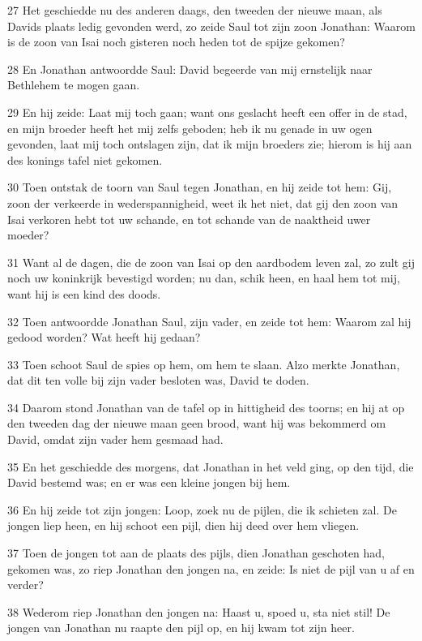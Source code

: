 \par 27 Het geschiedde nu des anderen daags, den tweeden der nieuwe maan, als Davids plaats ledig gevonden werd, zo zeide Saul tot zijn zoon Jonathan: Waarom is de zoon van Isai noch gisteren noch heden tot de spijze gekomen?
\par 28 En Jonathan antwoordde Saul: David begeerde van mij ernstelijk naar Bethlehem te mogen gaan.
\par 29 En hij zeide: Laat mij toch gaan; want ons geslacht heeft een offer in de stad, en mijn broeder heeft het mij zelfs geboden; heb ik nu genade in uw ogen gevonden, laat mij toch ontslagen zijn, dat ik mijn broeders zie; hierom is hij aan des konings tafel niet gekomen.
\par 30 Toen ontstak de toorn van Saul tegen Jonathan, en hij zeide tot hem: Gij, zoon der verkeerde in wederspannigheid, weet ik het niet, dat gij den zoon van Isai verkoren hebt tot uw schande, en tot schande van de naaktheid uwer moeder?
\par 31 Want al de dagen, die de zoon van Isai op den aardbodem leven zal, zo zult gij noch uw koninkrijk bevestigd worden; nu dan, schik heen, en haal hem tot mij, want hij is een kind des doods.
\par 32 Toen antwoordde Jonathan Saul, zijn vader, en zeide tot hem: Waarom zal hij gedood worden? Wat heeft hij gedaan?
\par 33 Toen schoot Saul de spies op hem, om hem te slaan. Alzo merkte Jonathan, dat dit ten volle bij zijn vader besloten was, David te doden.
\par 34 Daarom stond Jonathan van de tafel op in hittigheid des toorns; en hij at op den tweeden dag der nieuwe maan geen brood, want hij was bekommerd om David, omdat zijn vader hem gesmaad had.
\par 35 En het geschiedde des morgens, dat Jonathan in het veld ging, op den tijd, die David bestemd was; en er was een kleine jongen bij hem.
\par 36 En hij zeide tot zijn jongen: Loop, zoek nu de pijlen, die ik schieten zal. De jongen liep heen, en hij schoot een pijl, dien hij deed over hem vliegen.
\par 37 Toen de jongen tot aan de plaats des pijls, dien Jonathan geschoten had, gekomen was, zo riep Jonathan den jongen na, en zeide: Is niet de pijl van u af en verder?
\par 38 Wederom riep Jonathan den jongen na: Haast u, spoed u, sta niet stil! De jongen van Jonathan nu raapte den pijl op, en hij kwam tot zijn heer.
